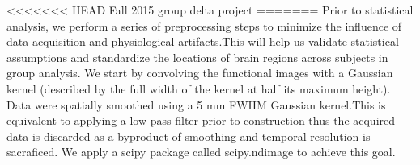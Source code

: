 <<<<<<< HEAD
Fall 2015 group delta project
=======
Prior to statistical analysis, we perform a series of preprocessing steps to 
minimize the influence of data acquisition and physiological artifacts.This  
will help us validate statistical assumptions and standardize the locations of
brain regions across subjects in group analysis. We start by convolving the 
functional images with a Gaussian kernel (described by the full width of the 
kernel at half its maximum height). Data were spatially smoothed using a 5 mm 
FWHM Gaussian kernel.This is equivalent to applying a low-pass filter prior to
construction thus the acquired data is discarded as a byproduct of smoothing and
temporal resolution is sacraficed. We apply a scipy package called scipy.ndimage
to achieve this goal.


